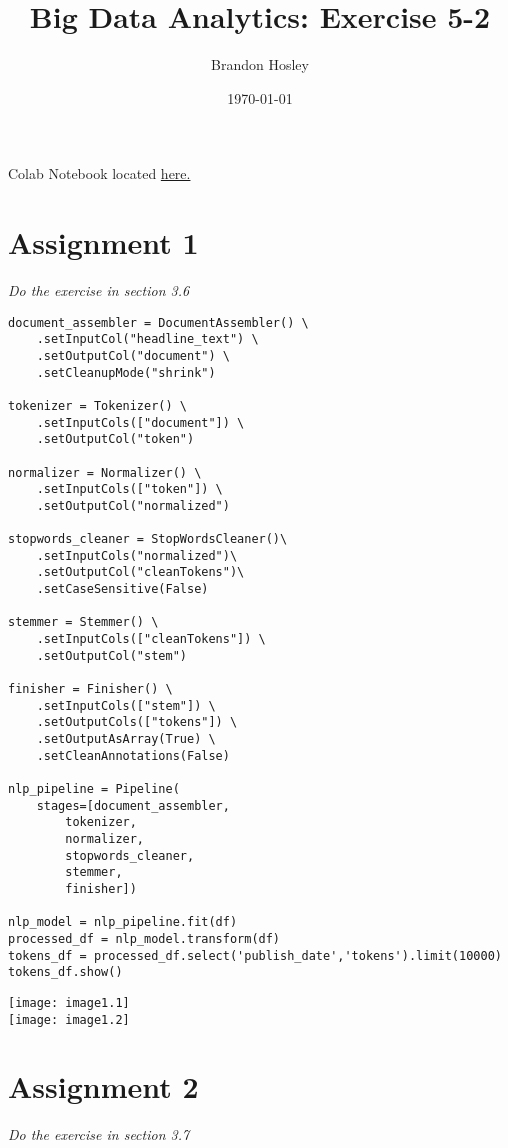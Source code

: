 \documentclass[]{article}
\title{Big Data Analytics: Exercise 5-2}
\author{Brandon Hosley}
\date{\today}
\begin{document}
\maketitle

\vspace{-1.5em}

Colab Notebook located
\href{https://colab.research.google.com/drive/1rxCV1SSGTpGZSGphk5AH8Iuuz3TFCNxB?usp=sharing}{here.}

\vspace{-1.5em}

\section*{Assignment 1}
\vspace{-1em}
\emph{ Do the exercise in section 3.6 }
\vspace{-0.5em}

\begin{verbatim}
document_assembler = DocumentAssembler() \
	.setInputCol("headline_text") \
	.setOutputCol("document") \
	.setCleanupMode("shrink")

tokenizer = Tokenizer() \
	.setInputCols(["document"]) \
	.setOutputCol("token")

normalizer = Normalizer() \
	.setInputCols(["token"]) \
	.setOutputCol("normalized")

stopwords_cleaner = StopWordsCleaner()\
	.setInputCols("normalized")\
	.setOutputCol("cleanTokens")\
	.setCaseSensitive(False)

stemmer = Stemmer() \
	.setInputCols(["cleanTokens"]) \
	.setOutputCol("stem")

finisher = Finisher() \
	.setInputCols(["stem"]) \
	.setOutputCols(["tokens"]) \
	.setOutputAsArray(True) \
	.setCleanAnnotations(False)

nlp_pipeline = Pipeline(
	stages=[document_assembler, 
		tokenizer,
		normalizer,
		stopwords_cleaner, 
		stemmer, 
		finisher])

nlp_model = nlp_pipeline.fit(df)
processed_df = nlp_model.transform(df)
tokens_df = processed_df.select('publish_date','tokens').limit(10000)
tokens_df.show()
\end{verbatim}
\texttt{[image: image1.1]} \\
\texttt{[image: image1.2]}

\section*{Assignment 2}
\emph{ Do the exercise in section 3.7 }
\end{document}
